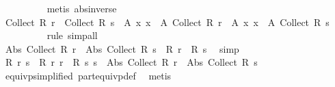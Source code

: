 \begin{isabellebody}
\ \ \ \ \ \ \ \ \isamarkupfalse%
\ {\isacharparenleft}{\kern0pt}metis\ abs{\isacharunderscore}{\kern0pt}inverse{\isacharparenright}{\kern0pt}\isanewline
\ \ \ \ \ \ \isamarkupfalse%
\ \isamarkupfalse%
\ {\isachardoublequoteopen}Collect\ {\isacharparenleft}{\kern0pt}R\ r{\isacharparenright}{\kern0pt}\ {\isacharequal}{\kern0pt}\ Collect\ {\isacharparenleft}{\kern0pt}R\ s{\isacharparenright}{\kern0pt}\ {\isasymlongleftrightarrow}\ {\isacharparenleft}{\kern0pt}{\isasymlambda}A\ x{\isachardot}{\kern0pt}\ x\ {\isasymin}\ A{\isacharparenright}{\kern0pt}\ {\isacharparenleft}{\kern0pt}Collect\ {\isacharparenleft}{\kern0pt}R\ r{\isacharparenright}{\kern0pt}{\isacharparenright}{\kern0pt}\ {\isacharequal}{\kern0pt}\ {\isacharparenleft}{\kern0pt}{\isasymlambda}A\ x{\isachardot}{\kern0pt}\ x\ {\isasymin}\ A{\isacharparenright}{\kern0pt}\ {\isacharparenleft}{\kern0pt}Collect\ {\isacharparenleft}{\kern0pt}R\ s{\isacharparenright}{\kern0pt}{\isacharparenright}{\kern0pt}{\isachardoublequoteclose}\isanewline
\ \ \ \ \ \ \ \ \isamarkupfalse%
\ rule\ simp{\isacharunderscore}{\kern0pt}all\isanewline
\ \ \ \ \ \ \isamarkupfalse%
\ \isamarkupfalse%
\ {\isachardoublequoteopen}Abs\ {\isacharparenleft}{\kern0pt}Collect\ {\isacharparenleft}{\kern0pt}R\ r{\isacharparenright}{\kern0pt}{\isacharparenright}{\kern0pt}\ {\isacharequal}{\kern0pt}\ Abs\ {\isacharparenleft}{\kern0pt}Collect\ {\isacharparenleft}{\kern0pt}R\ s{\isacharparenright}{\kern0pt}{\isacharparenright}{\kern0pt}\ {\isasymlongleftrightarrow}\ R\ r\ {\isacharequal}{\kern0pt}\ R\ s{\isachardoublequoteclose}\ \isamarkupfalse%
\ simp\isanewline
\ \ \ \ \isamarkupfalse%
\isanewline
\ \ \ \ \isamarkupfalse%
\ \isamarkupfalse%
\ {\isachardoublequoteopen}R\ r\ s\ {\isasymlongleftrightarrow}\ R\ r\ r\ {\isasymand}\ R\ s\ s\ {\isasymand}\ {\isacharparenleft}{\kern0pt}Abs\ {\isacharparenleft}{\kern0pt}Collect\ {\isacharparenleft}{\kern0pt}R\ r{\isacharparenright}{\kern0pt}{\isacharparenright}{\kern0pt}\ {\isacharequal}{\kern0pt}\ Abs\ {\isacharparenleft}{\kern0pt}Collect\ {\isacharparenleft}{\kern0pt}R\ s{\isacharparenright}{\kern0pt}{\isacharparenright}{\kern0pt}{\isacharparenright}{\kern0pt}{\isachardoublequoteclose}\isanewline
\ \ \ \ \ \ \isamarkupfalse%
\ equivp{\isacharbrackleft}{\kern0pt}simplified\ part{\isacharunderscore}{\kern0pt}equivp{\isacharunderscore}{\kern0pt}def{\isacharbrackright}{\kern0pt}\ \isamarkupfalse%
\ metis\isanewline

\end{isabellebody}
